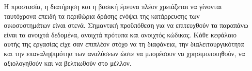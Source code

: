 \documentclass[11pt]{article}
\begin{document}
Η προστασία, η διατήρηση και η βασική έρευνα πλέον χρειάζεται να 
γίνονται ταυτόχρονα επειδή τα περιθώρια δράσης ενόψει της κατάρρευσης των
οικοσυστημάτων είναι στενά.
Σημαντική προϋπόθεση για να επιτευχθούν τα παραπάνω είναι τα ανοιχτά δεδομένα,
ανοιχτά πρότυπα και ανοιχτός κώδικας. Κάθε κεφάλαιο αυτής της εργασίας είχε σαν 
επιπλέον στόχο να τη διαφάνεια, την διαλειτουργικότητα και την επαναληψιμότηα 
των αναλύσεων ώστε να μπορέσουν να χρησιμοποιηθούν, να αξιολογηθούν και να βελτιωθούν στο μέλλον.
\end{document}
